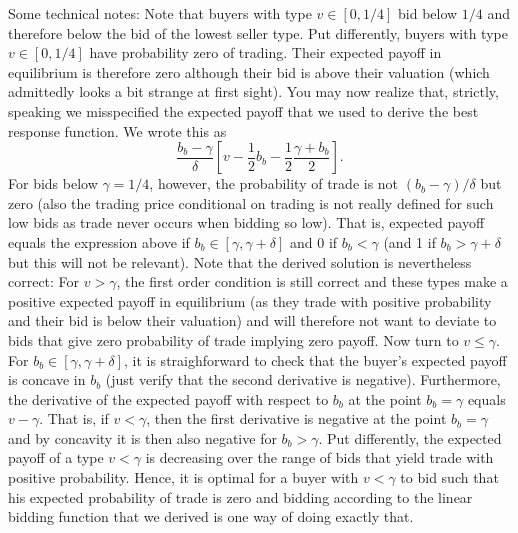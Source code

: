 \documentclass[a4paper,11pt]{article}
\begin{document}
Some technical notes: Note that buyers with type $v\in[0,1/4]$ bid below $1/4$ and therefore below the bid of the lowest seller type. Put differently, buyers with type $v\in[0,1/4]$ have probability zero of trading. Their expected payoff in equilibrium is therefore zero although their bid is above their valuation (which admittedly looks a bit strange at first sight). You may now realize that, strictly, speaking we misspecified the expected payoff that we used to derive the best response function. We wrote this as
\begin{equation*}
  \frac{b_b-\gamma}{\delta}\left[v-\frac{1}{2}b_b-\frac{1}{2}\frac{\gamma+b_b}{2}\right].
\end{equation*}
For bids below $\gamma=1/4$, however, the probability of trade is not $(b_b-\gamma)/\delta$ but zero (also the trading price conditional on trading is not really defined for such low bids as trade never occurs when bidding so low). That is, expected payoff equals the expression above if $b_b\in[\gamma,\gamma+\delta]$ and 0 if $b_b<\gamma$ (and 1 if $b_b>\gamma+\delta$ but this will not be relevant). Note that the derived solution is nevertheless correct: For $v>\gamma$, the first order condition is still correct and these types make a positive expected payoff in equilibrium (as they trade with positive probability and their bid is below their valuation) and will therefore not want to deviate to bids that give zero probability of trade implying zero payoff. Now turn to $v\leq \gamma$. For $b_b\in[\gamma,\gamma+\delta]$, it is straighforward to check that the buyer's expected payoff is concave in $b_b$ (just verify that the second derivative is negative). Furthermore, the derivative of the expected payoff with respect to $b_b$ at the point $b_b=\gamma$ equals $v-\gamma$. That is, if $v<\gamma$, then the first derivative is negative at the point $b_b=\gamma$ and by concavity it is then also negative for $b_b>\gamma$. Put differently, the expected payoff of a type $v<\gamma$ is decreasing over the range of bids that yield trade with positive probability. Hence, it is optimal for a buyer with $v<\gamma$ to bid such that his expected probability of trade is zero and bidding according to the linear bidding function that we derived is one way of doing exactly that.
\end{document}

